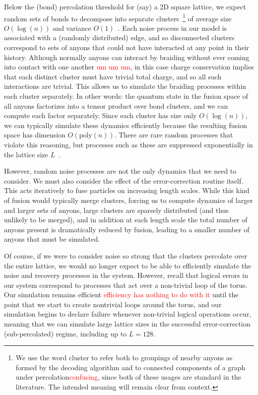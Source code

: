\documentclass[aps, prl, letterpaper, twocolumn, superscriptaddress, notitlepage, 10pt]{revtex4-1}
\newcommand{\dude}[1]{\textcolor{red}{#1}}
\begin{document}
Below the (bond) percolation threshold for (say) a 2D square lattice, we expect random sets of 
bonds to decompose into separate clusters~\footnote{
We use the word cluster to refer both to groupings 
of nearby anyons as formed by the decoding algorithm and 
to connected components of a graph under percolation\dude{confusing}, since both 
of these usages are standard in the literature. The intended 
meaning will remain clear from context.} of average size $O(\log(n))$ and variance 
$O(1)$~\cite{Bazant2000}.
Each noise process in our model is associated with a (randomly distributed) edge, and so 
disconnected clusters correspond to sets of anyons that could not have interacted at any 
point in their history. 
Although normally anyons can interact by braiding without ever coming 
into contact with one another \dude{um um um}, in this case charge conservation 
implies that each distinct cluster must have trivial total charge, and so all such interactions are trivial.
This allows us to simulate the braiding processes within each cluster 
separately. In other words: the quantum state in the fusion space of all anyons factorizes into 
a tensor product over bond clusters, and we can compute each factor separately. Since each 
cluster has size only $O(\log(n))$, we can typically simulate these dynamics efficiently 
because the resulting fusion space has dimension $O(\mathrm{poly}(n))$. There are rare 
random processes that violate this reasoning, but processes such as these are suppressed 
exponentially in the lattice size $L$~\cite{Grimmett1989}. 

However, random noise processes are not the only dynamics that we need to consider. We 
must also consider the effect of the error-correction routine itself. This acts iteratively to fuse 
particles on increasing length scales. While this kind of fusion would typically merge clusters, 
forcing us to compute dynamics of larger and larger sets of anyons, large clusters are sparsely distributed 
(and thus unlikely to be merged), and in addition at each length scale the total number of 
anyons present is dramatically reduced by fusion, leading to a smaller number of anyons that 
must be simulated.

Of course, if we were to consider noise so strong that 
the clusters percolate over the entire lattice, we would no 
longer expect to be able to efficiently simulate the noise and recovery processes in the system. 
However, recall that logical errors in our system correspond to processes that act over a non-trivial loop of the torus. 
Our simulation remains efficient \dude{efficiency has nothing to do with it}
until the point that we start to create nontrivial loops around the torus, 
and our simulation begins to declare failure whenever non-trivial logical 
operations occur, meaning that we can simulate large lattice sizes 
in the successful error-correction (sub-percolated) regime, including up to $L=128$.
\end{document}
